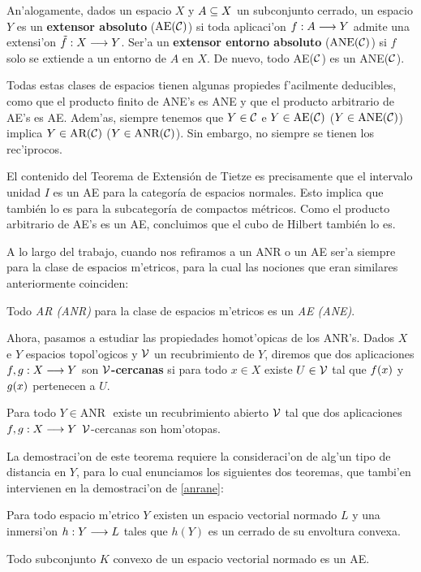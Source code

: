 An'alogamente, dados un espacio $ X  $ y $ A\subseteq X  $ un subconjunto cerrado, un espacio $ Y  $ es un \textbf{extensor absoluto} ($ \text{AE}(\mathcal{C} ) $) si toda aplicaci'on $ f:A\longrightarrow Y  $ admite una extensi'on $ \tilde{f }:X\longrightarrow Y  $. Ser'a un \textbf{extensor entorno absoluto } ($ \text{ANE} (\mathcal{C} ) $) si $ f  $ solo se extiende a un entorno de $ A  $ en $ X  $. De nuevo, todo AE($ \mathcal{C}  $) es un ANE($ \mathcal{C}  $).

Todas estas clases de espacios tienen algunas propiedes f'acilmente deducibles, como que el producto finito de ANE's es ANE y que el producto arbitrario de AE's es AE. Adem'as, siempre tenemos que $ Y\in \mathcal{C}  $ e $ Y\in \text{AE}(\mathcal{C}) $ ($ Y\in \text{ANE}(\mathcal{C}) $) implica $ Y\in \text{AR}(\mathcal{C}) $ ($ Y\in \text{ANR}(\mathcal{C}) $). Sin embargo, no siempre se tienen los rec'iprocos.

\begin{example}\label{tietze}
  El contenido del Teorema de Extensión de Tietze \cite[p. 49]{dugundji1966topology} es precisamente que el intervalo unidad $ I  $ es un AE para la categoría de espacios normales. Esto implica que también lo es para la subcategoría de compactos métricos. Como el producto arbitrario de AE's es un AE, concluimos que el cubo de Hilbert también lo es.
\end{example}

A lo largo del trabajo, cuando nos refiramos a un ANR o un AE ser'a siempre para la clase de espacios m'etricos, para la cual las nociones que eran similares anteriormente coinciden:
\begin{theorem}\label{anrane}
  Todo \emph{AR (ANR)} para la clase de espacios m'etricos es un \emph{AE (ANE)}.
\end{theorem}

Ahora, pasamos a estudiar las propiedades homot'opicas de los ANR's. Dados $ X $ e $ Y  $  espacios topol'ogicos  y $ \mathcal{V}  $ un recubrimiento de $ Y  $, diremos que dos aplicaciones $ f,g:X\longrightarrow Y  $ son \textbf{$ \mathcal{V}  $-cercanas} si para todo $ x\in X  $ existe $ U\in \mathcal{V}  $ tal que $ f(x)  $ y $ g(x)  $ pertenecen a $ U  $.

\begin{theorem}\label{vcercanashomotopas}
  Para todo \emph{$ Y\in\text{ANR } $} existe un recubrimiento abierto $ \mathcal{V} $ tal que dos aplicaciones $ f,g:X\longrightarrow Y  $ $ \mathcal{V}  $-cercanas son hom'otopas.
\end{theorem}

La demostraci'on de este teorema requiere la consideraci'on de alg'un tipo de distancia en $ Y  $, para lo cual enunciamos los siguientes dos teoremas, que tambi'en intervienen en la demostraci'on de \ref{anrane}:
\begin{theorem}\label{inmersionkuratowski}
  Para todo espacio m'etrico $ Y  $ existen un espacio vectorial normado $ L  $ y una inmersi'on $ h:Y\longrightarrow L  $ tales que $ h(Y)  $ es un cerrado de su envoltura convexa.
\end{theorem}
\begin{theorem}\label{extensiondugundji}
  Todo subconjunto $ K  $ convexo de un espacio vectorial normado es un AE.
\end{theorem}

